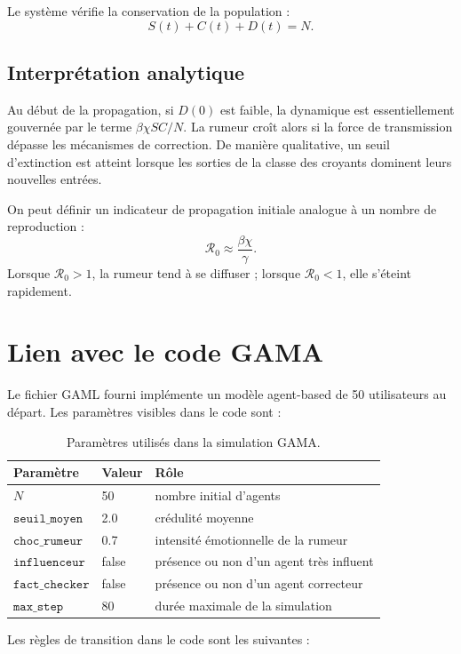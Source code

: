 \documentclass[11pt,a4paper]{article}
\begin{document}
Le système vérifie la conservation de la population :
\[
S(t) + C(t) + D(t) = N.
\]

\subsection{Interprétation analytique}

Au début de la propagation, si $D(0)$ est faible, la dynamique est essentiellement gouvernée par le terme $\beta\chi S C/N$. La rumeur croît alors si la force de transmission dépasse les mécanismes de correction. De manière qualitative, un seuil d'extinction est atteint lorsque les sorties de la classe des croyants dominent leurs nouvelles entrées.

On peut définir un indicateur de propagation initiale analogue à un nombre de reproduction :
\[
\mathcal{R}_0 \approx \frac{\beta\chi}{\gamma}.
\]
Lorsque $\mathcal{R}_0 > 1$, la rumeur tend à se diffuser ; lorsque $\mathcal{R}_0 < 1$, elle s'éteint rapidement.

\section{Lien avec le code GAMA}

Le fichier GAML fourni implémente un modèle agent-based de 50 utilisateurs au départ. Les paramètres visibles dans le code sont :

\begin{table}[H]
\centering
\caption{Paramètres utilisés dans la simulation GAMA.}
\begin{tabular}{@{}lll@{}}
\toprule
Paramètre & Valeur & Rôle \\
\midrule
$N$ & 50 & nombre initial d'agents \\
$\texttt{seuil\_moyen}$ & 2.0 & crédulité moyenne \\
$\texttt{choc\_rumeur}$ & 0.7 & intensité émotionnelle de la rumeur \\
$\texttt{influenceur}$ & false & présence ou non d'un agent très influent \\
$\texttt{fact\_checker}$ & false & présence ou non d'un agent correcteur \\
$\texttt{max\_step}$ & 80 & durée maximale de la simulation \\
\bottomrule
\end{tabular}
\label{tab:parametres}
\end{table}

Les règles de transition dans le code sont les suivantes :
\end{document}
